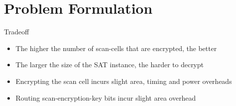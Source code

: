 \section{Problem Formulation}
\begin{frame}{Tradeoff}
\begin{itemize}
\item The higher the number of scan-cells that are encrypted, the better
\item The larger the size of the SAT instance, \alert{the harder to decrypt}
\item Encrypting the scan cell incurs \alert{slight area, timing and power overheads}
\item Routing scan-encryption-key bits incur \alert{slight area overhead}
\end{itemize}
\end{frame}

